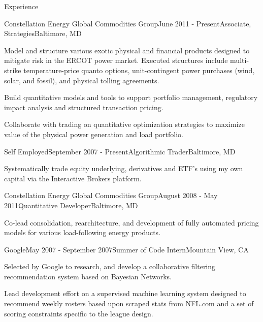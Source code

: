 \documentclass{resume} %
\begin{document}
\begin{rSection}{Experience}

\begin{rSubsection}{Constellation Energy Global Commodities Group}{June 2011 - Present}{Associate, Strategies}{Baltimore, MD}
\item Model and structure various exotic physical and financial products designed to mitigate risk in the ERCOT power market.  Executed structures include multi-strike temperature-price quanto options,  unit-contingent power purchases (wind, solar, and fossil), and physical tolling agreements.
\item Build quantitative models and tools to support portfolio management, regulatory impact analysis and structured transaction pricing.
\item Collaborate with trading on quantitative optimization strategies to maximize value of the physical power generation and load portfolio.
\end{rSubsection}


\begin{rSubsection}{Self Employed}{September 2007 - Present}{Algorithmic Trader}{Baltimore, MD}
\item Systematically trade equity underlying, derivatives and ETF's using my own capital via the Interactive Brokers platform.

\end{rSubsection}


\begin{rSubsection}{Constellation Energy Global Commodities Group}{August 2008 - May 2011}{Quantitative Developer}{Baltimore, MD}
\item Co-lead consolidation, rearchitecture, and development of fully automated pricing models for various load-following energy products.
\end{rSubsection}

\begin{rSubsection}{Google}{May 2007 - September 2007}{Summer of Code Intern}{Mountain View, CA}
\item Selected by Google to research, and develop a collaborative filtering recommendation system based on Bayesian Networks.
\item Lead development effort on a supervised machine learning system designed to recommend weekly rosters based upon scraped stats from NFL.com and a set of scoring constraints specific to the league design.
\end{rSubsection}

\end{rSection}
\end{document}
